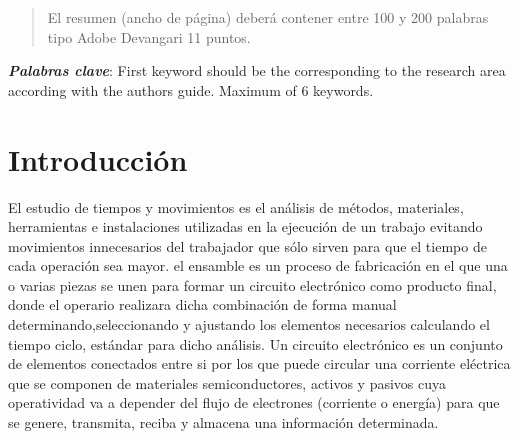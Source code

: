     
    
    \begin{abstract}
    \noindent 
    El resumen (ancho de página) deberá contener entre 100 y 200 palabras tipo Adobe Devangari 11 puntos.
    
    \end{abstract}
    \textbf{\textit{Palabras clave}}: {First keyword should be the corresponding to the research area according with the authors guide. Maximum of 6 keywords.}
    
    \section{Introducción}
    
    El estudio de tiempos y movimientos es el análisis de métodos, materiales, herramientas e instalaciones utilizadas en la ejecución de un trabajo evitando  movimientos innecesarios del trabajador que sólo sirven para que el tiempo de cada operación sea mayor.
    el ensamble es un proceso de fabricación  en el que una o varias piezas se unen para formar un circuito electrónico como producto final, donde el operario realizara dicha combinación de forma manual determinando,seleccionando y ajustando los elementos necesarios calculando  el tiempo ciclo, estándar para dicho análisis.
    Un circuito electrónico es un conjunto de elementos conectados entre si por los que puede circular una corriente eléctrica  que se componen de materiales semiconductores, activos y pasivos cuya operatividad va a depender del flujo de electrones (corriente o energía) para que se  genere, transmita, reciba y almacena una información determinada.\
    
